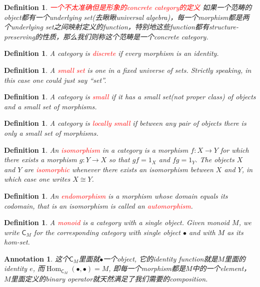 \documentclass{article}
\newtheorem{definition}[theorem]{Definition}
\newtheorem{annotation}[theorem]{Annotation}
\newcommand*{\cat}[1]{\textsf{#1}\xspace}
\newcommand{\id}{1}
\newcommand*{\xfunc}[4]{{#2}\colon{#3}{#1}{#4}}
\newcommand*{\func}[3]{\xfunc{\to}{#1}{#2}{#3}}
\DeclareMathOperator{\Hom}{Hom}
\newcommand{\redt}[1]{\textcolor{red}{#1}}
\begin{document}
\begin{definition}
\rm \redt{一个不太准确但是形象的concrete category的定义} 如果一个范畴的object都有一个underlying set(去瞅瞅universal algebra)，每一个morphism都是两个underlying set之间映射定义的function，特别地这些function都有structure-preserving的性质，那么我们则称这个范畴是一个concrete category. 
\end{definition}

\begin{definition}
\rm A category is \redt{discrete} if every morphism is an identity.
\end{definition}

\begin{definition}
\rm A \redt{small set} is one in a fixed universe of sets. Strictly speaking, in this case one could just say “set”.
\end{definition}

\begin{definition}
\rm A category is \redt{small} if it has a small set(not proper class) of objects and a small set of morphisms.
\end{definition}


\begin{definition}
\rm A category is \redt{locally small} if between any pair of objects there is only a small set of morphisms. 
\end{definition}

\begin{definition}
\rm An \redt{isomorphism} in a category is a morphism $\func{f}{X}{Y}$ for which there exists a morphism $\func{g}{Y}{X}$ so that $gf= \id_X$ and $fg = \id_Y.$ The objects $X$ and $Y$ are \redt{isomorphic} whenever there exists an isomorphism between $X$ and $Y$, in which case one writes $X \cong Y$. 
\end{definition}

\begin{definition}
\rm An \redt{endomorphism} is a morphism whose domain equals its codomain, that is an isomorphism is called an \redt{automorphism}. 
\end{definition}

\begin{definition}
\rm A \redt{monoid} is a category with a single object. Given monoid $M$, we write $\cat{C}_{M}$ for the corresponding category with single object $\bullet$ and with $M$ as its hom-set. 
\end{definition}

\begin{annotation}
\rm 这个$\cat{C}_M$里面就$\bullet$一个object, 它的identity function就是$M$里面的identity $e$, 而$\Hom_{\cat{C}_M}(\bullet,\bullet) = M$, 即每一个morphism都是$M$中的一个element， $M$里面定义的binary operator就天然满足了我们需要的composition. 
\end{annotation}
\end{document}
